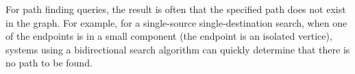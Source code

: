 
For path finding queries, the result is often that the specified path does not
exist in the graph. For example, for a single-source single-destination search,
when one of the endpoints is in a small component (\eg the endpoint is an
isolated vertice), systems using a bidirectional search algorithm can quickly
determine that there is no path to be found.


